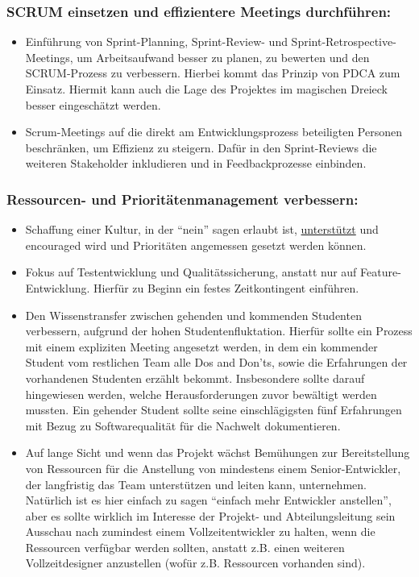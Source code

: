 \subsubsection*{SCRUM einsetzen und effizientere Meetings durchführen:}

\begin{itemize}
	\item Einführung von Sprint-Planning, Sprint-Review- und Sprint-Retrospective-Meetings, 
	um Arbeitsaufwand besser zu planen, zu bewerten und den SCRUM-Prozess zu verbessern. Hierbei kommt das 
	Prinzip von PDCA zum Einsatz. Hiermit kann auch die Lage des Projektes im magischen Dreieck besser eingeschätzt werden.
	\item Scrum-Meetings auf die direkt am Entwicklungsprozess beteiligten Personen beschränken, um Effizienz zu steigern.
	Dafür in den Sprint-Reviews die weiteren Stakeholder inkludieren und in Feedbackprozesse einbinden.  
\end{itemize}

\subsubsection*{Ressourcen- und Prioritätenmanagement verbessern:}

\begin{itemize}
	\item Schaffung einer Kultur, in der \enquote{nein} sagen erlaubt ist, \underline{unterstützt} und encouraged wird 
	und Prioritäten angemessen gesetzt werden können.
	\item Fokus auf Testentwicklung und Qualitätssicherung, anstatt nur auf Feature-Entwicklung.
	Hierfür zu Beginn ein festes Zeitkontingent einführen.
	\item Den Wissenstransfer zwischen gehenden und kommenden Studenten verbessern, aufgrund der hohen Studentenfluktation.
	Hierfür sollte ein Prozess mit einem expliziten Meeting angesetzt werden, in dem ein kommender Student 
	vom restlichen Team alle Dos and Don'ts, sowie die Erfahrungen der vorhandenen Studenten erzählt bekommt. 
	Insbesondere sollte darauf hingewiesen werden, welche Herausforderungen zuvor bewältigt werden mussten. 
	Ein gehender Student sollte seine einschlägigsten fünf Erfahrungen mit Bezug zu Softwarequalität für 
	die Nachwelt dokumentieren.  
	\item Auf lange Sicht und wenn das Projekt wächst Bemühungen zur Bereitstellung von Ressourcen 
	für die Anstellung von mindestens einem Senior-Entwickler, der langfristig das Team unterstützen und leiten kann, unternehmen. 
	Natürlich ist es hier einfach zu sagen \enquote{einfach mehr Entwickler anstellen}, 
	aber es sollte wirklich im Interesse der Projekt- und Abteilungsleitung sein Ausschau nach zumindest einem 
	Vollzeitentwickler zu halten, wenn die Ressourcen verfügbar werden sollten, anstatt z.B. einen weiteren 
	Vollzeitdesigner anzustellen (wofür z.B. Ressourcen vorhanden sind).  
\end{itemize}


